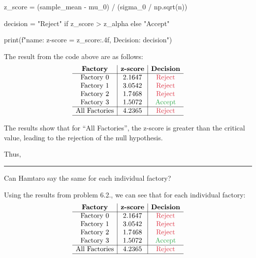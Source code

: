 \documentclass[a4paper, 10pt]{article}
\begin{document}
\begin{tosubmit}
\begin{codingbox}
    z_score = (sample_mean - mu_0) / (sigma_0 / np.sqrt(n))

    decision = "Reject" if z_score > z_alpha else "Accept"

    print(f"{name}: z-score = {z_score:.4f}, Decision: {decision}")
\end{codingbox}

The result from the code above are as follows:
\[
\begin{array}{c|c|c}
    \textbf{Factory} & \textbf{z-score} & \textbf{Decision} \\
    \hline
    \text{Factory 0} & 2.1647 & \textcolor[HTML]{DC3545}{\text{Reject}} \\
    \text{Factory 1} & 3.0542 & \textcolor[HTML]{DC3545}{\text{Reject}} \\
    \text{Factory 2} & 1.7468 & \textcolor[HTML]{DC3545}{\text{Reject}} \\
    \text{Factory 3} & 1.5072 & \textcolor[HTML]{28A745}{\text{Accept}} \\
    \hline
    \text{All Factories} & 4.2365 & \textcolor[HTML]{DC3545}{\text{Reject}} \\
    \hline
\end{array}
\]

The results show that for ``All Factories'', the z-score is greater than the critical value, leading to the rejection of the null hypothesis.

\vspace{2mm}

Thus, 

\vspace{3mm} \hrule \vspace{3mm}
\newpage

\begin{subproblems}[resume]
    \item Can Hamtaro say the same for each individual factory?
\end{subproblems}

\par\noindent\submitsolution
Using the results from problem 6.2., we can see that for each individual factory:
\[
\begin{array}{c|c|c}
    \textbf{Factory} & \textbf{z-score} & \textbf{Decision} \\
    \hline
    \text{Factory 0} & 2.1647 & \textcolor[HTML]{DC3545}{\text{Reject}} \\
    \text{Factory 1} & 3.0542 & \textcolor[HTML]{DC3545}{\text{Reject}} \\
    \text{Factory 2} & 1.7468 & \textcolor[HTML]{DC3545}{\text{Reject}} \\
    \text{Factory 3} & 1.5072 & \textcolor[HTML]{28A745}{\text{Accept}} \\
    \hline
    \text{All Factories} & 4.2365 & \textcolor[HTML]{DC3545}{\text{Reject}} \\
    \hline
\end{array}
\]


\end{tosubmit}
\end{document}
